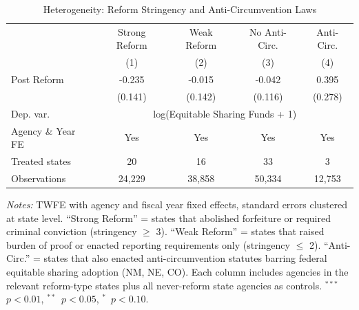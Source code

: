 \begin{table}[!htbp]
\centering
\begin{threeparttable}
\caption{Heterogeneity: Reform Stringency and Anti-Circumvention Laws}
\label{tab:heterogeneity}
\begin{tabular}{@{}lcccc@{}}
\toprule
 & Strong Reform & Weak Reform & No Anti-Circ. & Anti-Circ. \\
 & (1) & (2) & (3) & (4) \\
\midrule
Post Reform & -0.235 & -0.015 & -0.042 & 0.395 \\
 & (0.141) & (0.142) & (0.116) & (0.278) \\
\midrule
Dep. var. & \multicolumn{4}{c}{log(Equitable Sharing Funds + 1)} \\
Agency \& Year FE & Yes & Yes & Yes & Yes \\
Treated states & 20 & 16 & 33 & 3 \\
Observations & 24,229 & 38,858 & 50,334 & 12,753 \\
\bottomrule
\end{tabular}
\begin{tablenotes}[flushleft]\small
\item \textit{Notes:} TWFE with agency and fiscal year fixed effects, standard errors clustered at state level. ``Strong Reform'' = states that abolished forfeiture or required criminal conviction (stringency $\geq$ 3). ``Weak Reform'' = states that raised burden of proof or enacted reporting requirements only (stringency $\leq$ 2). ``Anti-Circ.'' = states that also enacted anti-circumvention statutes barring federal equitable sharing adoption (NM, NE, CO). Each column includes agencies in the relevant reform-type states plus all never-reform state agencies as controls. $^{***}$~$p<0.01$, $^{**}$~$p<0.05$, $^{*}$~$p<0.10$.
\end{tablenotes}
\end{threeparttable}
\end{table}

